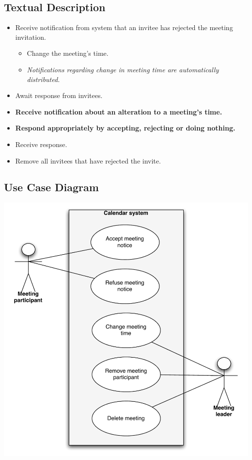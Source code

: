 \documentclass{article}
\begin{document}
\subsection{Textual Description}

\begin{itemize}
\item Receive notification from system that an invitee has rejected the
meeting invitation.
\begin{itemize}
\item Change the meeting's time.

\item \textit{Notifications regarding change in meeting time are
automatically distributed.}
\end{itemize}

\item Await response from invitees.

\item \textbf{Receive notification about an alteration to a meeting's time.}

\item \textbf{Respond appropriately by accepting, rejecting or doing nothing.}

\item Receive response.

\item Remove all invitees that have rejected the invite.
\end{itemize}

\subsection{Use Case Diagram}

\includegraphics[scale=0.9]{usecase3FP.pdf}
\end{document}
